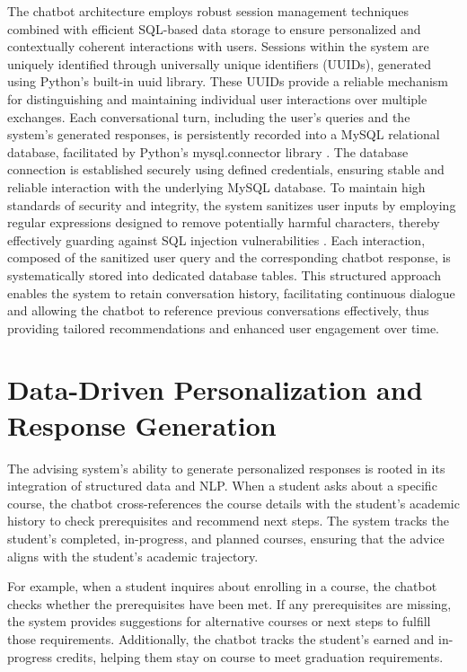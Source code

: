 \documentclass[12pt,oneside,openany]{report}
\begin{document}
The chatbot architecture employs robust session management techniques combined with efficient SQL-based data storage to ensure personalized and contextually coherent interactions with users. Sessions within the system are uniquely identified through universally unique identifiers (UUIDs), generated using Python’s built-in uuid library\cite{pythonUUID}. These UUIDs provide a reliable mechanism for distinguishing and maintaining individual user interactions over multiple exchanges. Each conversational turn, including the user's queries and the system’s generated responses, is persistently recorded into a MySQL relational database, facilitated by Python’s mysql.connector library \cite{mysql_connector_python_example_connecting}. The database connection is established securely using defined credentials, ensuring stable and reliable interaction with the underlying MySQL database. To maintain high standards of security and integrity, the system sanitizes user inputs by employing regular expressions designed to remove potentially harmful characters, thereby effectively guarding against SQL injection vulnerabilities \cite{pokhrel2024building}. Each interaction, composed of the sanitized user query and the corresponding chatbot response, is systematically stored into dedicated database tables. This structured approach enables the system to retain conversation history, facilitating continuous dialogue and allowing the chatbot to reference previous conversations effectively, thus providing tailored recommendations and enhanced user engagement over time.


\section{Data-Driven Personalization and Response Generation}

The advising system’s ability to generate personalized responses is rooted in its integration of structured data and NLP. When a student asks about a specific course, the chatbot cross-references the course details with the student’s academic history to check prerequisites and recommend next steps. The system tracks the student’s completed, in-progress, and planned courses, ensuring that the advice aligns with the student’s academic trajectory.

For example, when a student inquires about enrolling in a course, the chatbot checks whether the prerequisites have been met. If any prerequisites are missing, the system provides suggestions for alternative courses or next steps to fulfill those requirements. Additionally, the chatbot tracks the student’s earned and in-progress credits, helping them stay on course to meet graduation requirements.
\end{document}
